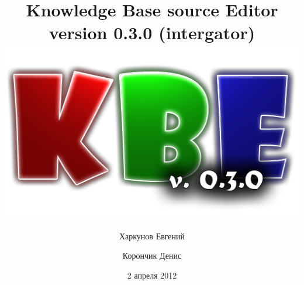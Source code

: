 \newpage
\title{
	\textcolor[rgb]{.67,.05,.05}{Knowledge} \textcolor[rgb]{.23,.62,.25}{Base} source \textcolor[rgb]{.11,.45,.86}{Editor} 					\\version 0.3.0 (intergator)
	\includegraphics[]{../images/title.png}
}
\author{Харкунов Евгений \and Корончик Денис}
\date{2 апреля 2012}
\maketitle
